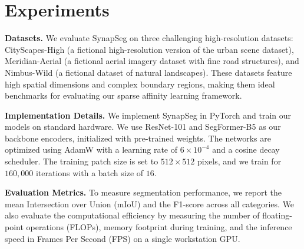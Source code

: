 \section{Experiments}
\textbf{Datasets.} We evaluate SynapSeg on three challenging high-resolution datasets: CityScapes-High (a fictional high-resolution version of the urban scene dataset), Meridian-Aerial (a fictional aerial imagery dataset with fine road structures), and Nimbus-Wild (a fictional dataset of natural landscapes). These datasets feature high spatial dimensions and complex boundary regions, making them ideal benchmarks for evaluating our sparse affinity learning framework.

\textbf{Implementation Details.} We implement SynapSeg in PyTorch and train our models on standard hardware. We use ResNet-101 and SegFormer-B5 as our backbone encoders, initialized with pre-trained weights. The networks are optimized using AdamW with a learning rate of $6 \times 10^{-4}$ and a cosine decay scheduler. The training patch size is set to $512 \times 512$ pixels, and we train for $160,000$ iterations with a batch size of $16$.

\textbf{Evaluation Metrics.} To measure segmentation performance, we report the mean Intersection over Union (mIoU) and the F1-score across all categories. We also evaluate the computational efficiency by measuring the number of floating-point operations (FLOPs), memory footprint during training, and the inference speed in Frames Per Second (FPS) on a single workstation GPU.
